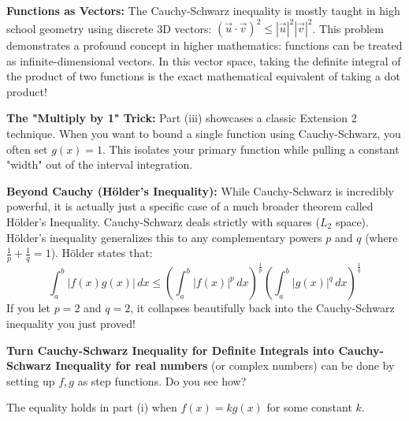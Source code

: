 \begin{takeaways}
    \item \textbf{Functions as Vectors:} The Cauchy-Schwarz inequality is mostly taught in high school geometry using discrete 3D vectors: $(\vec{u} \cdot \vec{v})^2 \le |\vec{u}|^2 |\vec{v}|^2$. This problem demonstrates a profound concept in higher mathematics: functions can be treated as infinite-dimensional vectors. In this vector space, taking the definite integral of the product of two functions is the exact mathematical equivalent of taking a dot product!
    \item \textbf{The "Multiply by 1" Trick:} Part (iii) showcases a classic Extension 2 technique. When you want to bound a single function using Cauchy-Schwarz, you often set $g(x) = 1$. This isolates your primary function while pulling a constant "width" out of the interval integration.
    \item \textbf{Beyond Cauchy (Hölder's Inequality):} While Cauchy-Schwarz is incredibly powerful, it is actually just a specific case of a much broader theorem called Hölder's Inequality. Cauchy-Schwarz deals strictly with squares ($L_2$ space). Hölder's inequality generalizes this to any complementary powers $p$ and $q$ (where $\frac{1}{p} + \frac{1}{q} = 1$).
    Hölder states that:
    $$\int_a^b |f(x)g(x)| \, dx \le \left( \int_a^b |f(x)|^p \, dx \right)^{\frac{1}{p}} \left( \int_a^b |g(x)|^q \, dx \right)^{\frac{1}{q}}$$
    If you let $p = 2$ and $q = 2$, it collapses beautifully back into the Cauchy-Schwarz inequality you just proved!
    \item \textbf{Turn Cauchy-Schwarz Inequality for Definite Integrals into  Cauchy-Schwarz Inequality for real numbers} (or complex numbers) can be done by setting up $f, g$ as step functions. Do you see how? 
    \item The equality holds in part (i) when $f(x) = k g(x)$ for some constant $k$.
\end{takeaways}
